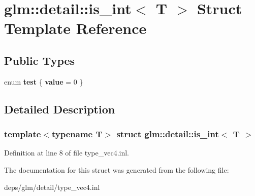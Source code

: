 \hypertarget{structglm_1_1detail_1_1is__int}{}\section{glm\+:\+:detail\+:\+:is\+\_\+int$<$ T $>$ Struct Template Reference}
\label{structglm_1_1detail_1_1is__int}
\subsection*{Public Types}
\begin{DoxyCompactItemize}
\item 
\mbox{\label{structglm_1_1detail_1_1is__int_a6a1d15bd1184bc07664114fa30199e01}} 
enum {\bfseries test} \{ {\bfseries value} = 0
 \}
\end{DoxyCompactItemize}


\subsection{Detailed Description}
\subsubsection*{template$<$typename T$>$\newline
struct glm\+::detail\+::is\+\_\+int$<$ T $>$}



Definition at line 8 of file type\+\_\+vec4.\+inl.



The documentation for this struct was generated from the following file\+:\begin{DoxyCompactItemize}
\item 
deps/glm/detail/type\+\_\+vec4.\+inl\end{DoxyCompactItemize}
